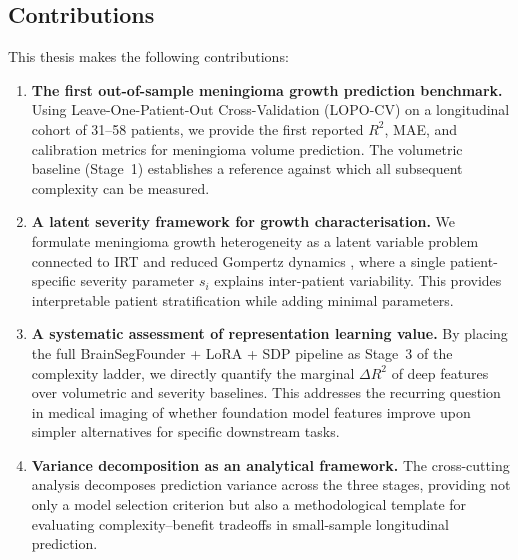 \subsection{Contributions}
\label{sec:intro:contributions}

This thesis makes the following contributions:

\begin{enumerate}[leftmargin=*]
  \item \textbf{The first out-of-sample meningioma growth prediction
    benchmark.} Using Leave-One-Patient-Out Cross-Validation (LOPO-CV) on a
    longitudinal cohort of 31--58 patients, we provide the first reported
    $R^2$, MAE, and calibration metrics for meningioma volume prediction.
    The volumetric baseline (Stage~1) establishes a reference against which
    all subsequent complexity can be measured.

  \item \textbf{A latent severity framework for growth characterisation.}
    We formulate meningioma growth heterogeneity as a latent variable problem
    connected to IRT and reduced Gompertz dynamics
    \cite{vaghi2020reduced}, where a single patient-specific severity
    parameter $s_i$ explains inter-patient variability. This provides
    interpretable patient stratification while adding minimal parameters.

  \item \textbf{A systematic assessment of representation learning value.}
    By placing the full BrainSegFounder + LoRA + SDP pipeline as Stage~3
    of the complexity ladder, we directly quantify the marginal $\Delta R^2$
    of deep features over volumetric and severity baselines. This addresses
    the recurring question in medical imaging of whether foundation model
    features improve upon simpler alternatives for specific downstream tasks.

  \item \textbf{Variance decomposition as an analytical framework.}
    The cross-cutting analysis decomposes prediction variance across the
    three stages, providing not only a model selection criterion but also a
    methodological template for evaluating complexity--benefit tradeoffs in
    small-sample longitudinal prediction.
\end{enumerate}

